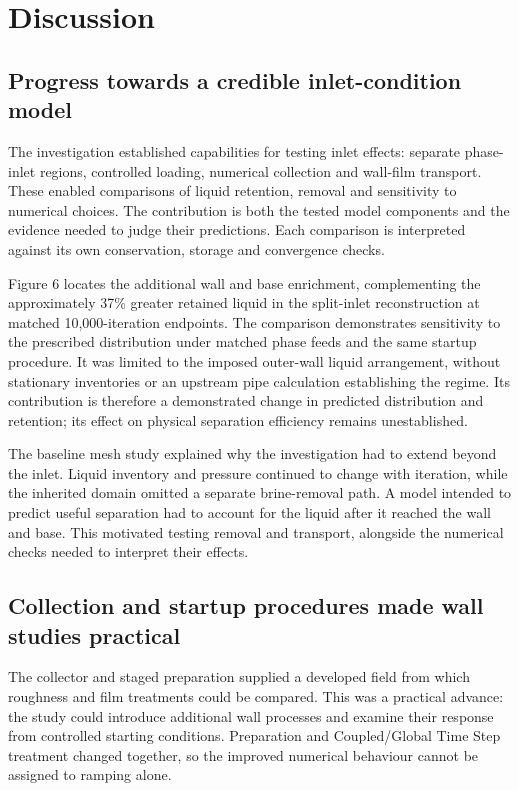 \section{Discussion}

\subsection{Progress towards a credible inlet-condition model}

The investigation established capabilities for testing inlet effects: separate phase-inlet regions, controlled loading, numerical collection and wall-film transport. These enabled comparisons of liquid retention, removal and sensitivity to numerical choices. The contribution is both the tested model components and the evidence needed to judge their predictions. Each comparison is interpreted against its own conservation, storage and convergence checks.

Figure 6 locates the additional wall and base enrichment, complementing the approximately 37\% greater retained liquid in the split-inlet reconstruction at matched 10,000-iteration endpoints. The comparison demonstrates sensitivity to the prescribed distribution under matched phase feeds and the same startup procedure. It was limited to the imposed outer-wall liquid arrangement, without stationary inventories or an upstream pipe calculation establishing the regime. Its contribution is therefore a demonstrated change in predicted distribution and retention; its effect on physical separation efficiency remains unestablished.

The baseline mesh study explained why the investigation had to extend beyond the inlet. Liquid inventory and pressure continued to change with iteration, while the inherited domain omitted a separate brine-removal path. A model intended to predict useful separation had to account for the liquid after it reached the wall and base. This motivated testing removal and transport, alongside the numerical checks needed to interpret their effects.

\subsection{Collection and startup procedures made wall studies practical}

The collector and staged preparation supplied a developed field from which roughness and film treatments could be compared. This was a practical advance: the study could introduce additional wall processes and examine their response from controlled starting conditions. Preparation and Coupled/Global Time Step treatment changed together, so the improved numerical behaviour cannot be assigned to ramping alone.

